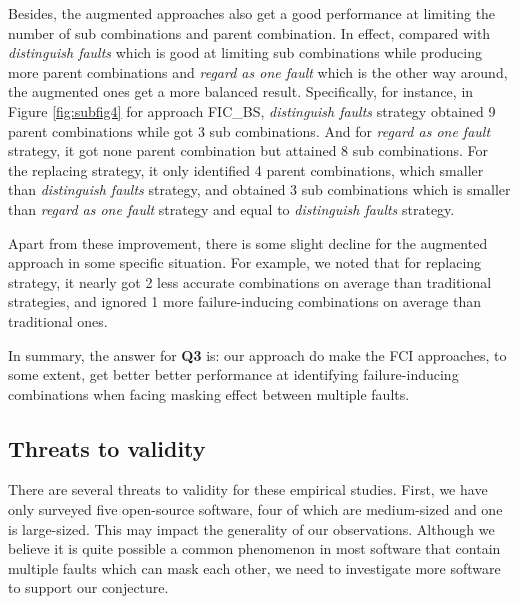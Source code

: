 \documentclass{sig-alternate}
\begin{document}
Besides, the augmented approaches also get a good performance at limiting the number of sub combinations and parent combination. In effect, compared with \emph{distinguish faults} which is good at limiting sub combinations while producing more parent combinations and \emph{regard as one fault} which is the other way around, the augmented ones get a more balanced result. Specifically, for instance, in Figure \ref{fig:subfig4} for approach FIC\_BS, \emph{distinguish faults} strategy obtained 9 parent combinations while got 3 sub combinations. And for \emph{regard as one fault} strategy, it got none parent combination but attained 8 sub combinations. For the replacing strategy, it only identified 4 parent combinations, which smaller than \emph{distinguish faults} strategy, and obtained 3 sub combinations which is smaller than \emph{regard as one fault} strategy and equal to \emph{distinguish faults} strategy.

Apart from these improvement, there is some slight decline for the augmented approach in some specific situation. For example, we noted that for replacing strategy, it nearly got 2 less accurate combinations on average than traditional strategies, and ignored 1 more failure-inducing combinations on average than traditional ones.


In summary, the answer for \textbf{Q3} is: our approach do make the FCI approaches, to some extent, get better better performance at identifying failure-inducing combinations when facing masking effect between multiple faults.

\subsection{Threats to validity}
There are several threats to validity for these empirical studies. First, we have only surveyed five open-source software, four of which are medium-sized and one is large-sized. This may impact the generality of our observations. Although we believe it is quite possible a common phenomenon in most software that contain multiple faults which can mask each other, we need to investigate more software to support our conjecture.
\end{document}
